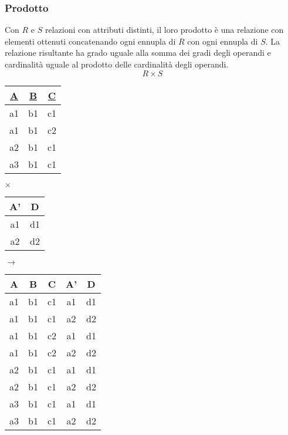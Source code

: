 \newpage
\subsubsection{Prodotto}
Con $R$ e $S$ relazioni con attributi distinti, il loro prodotto è una relazione con elementi ottenuti concatenando ogni ennupla di $R$ con ogni ennupla di $S$. La relazione risultante ha grado uguale alla somma dei gradi degli operandi e cardinalità uguale al prodotto delle cardinalità degli operandi.
\begin{equation}
	R \times S
\end{equation}
\begin{table}[!h]
	\centering
	\begin{tabular}{|c|c|c|}
		\hline
		\textbf{\underline{A}} & \textbf{\underline{B}} & \textbf{\underline{C}} \\
		\hline
		a1 & b1 & c1 \\
		\hline
		a1 & b1 & c2 \\
		\hline
		a2 & b1 & c1 \\
		\hline
		a3 & b1 & c1 \\
		\hline
	\end{tabular}
	\hspace{10pt} $\times$ \hspace{10pt}
	\begin{tabular}{|c|c|}
		\hline
		\textbf{A'} & \textbf{D} \\
		\hline
		a1 & d1 \\
		\hline
		a2 & d2 \\
		\hline
	\end{tabular}
	\hspace{10pt} $\longrightarrow$ \hspace{10pt}
	\begin{tabular}{|c|c|c|c|c|}
		\hline
		\textbf{A} & \textbf{B} & \textbf{C} & \textbf{A'} & \textbf{D} \\
		\hline
		a1 & b1 & c1 & a1 & d1 \\
		\hline
		a1 & b1 & c1 & a2& d2 \\
		\hline
		a1 & b1 & c2 & a1 & d1 \\
		\hline
		a1 & b1 & c2 & a2 & d2 \\
		\hline
		a2& b1 & c1 & a1 & d1 \\
		\hline
		a2 & b1 & c1 & a2 & d2 \\
		\hline
		a3 & b1 & c1 & a1 & d1 \\
		\hline
		a3 & b1 & c1 & a2 & d2 \\
		\hline		
	\end{tabular}
\end{table}

